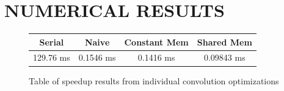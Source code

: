 \documentclass[12pt]{article}
\begin{document}







\section{\MakeUppercase{Numerical Results}}
\label{sec:NumericalResults}
\begin{figure}[h]
\begin{center}
\begin{tabular}{ |c|c|c|c|} 
 \hline
 Serial & Naive & Constant Mem & Shared Mem \\ 
 \hline
 129.76 ms & 0.1546 ms & 0.1416 ms & 0.09843 ms\\
 \hline
\end{tabular}\caption{Table of speedup results from individual convolution optimizations}\label{table:convolutionTimes}
\end{center}
\end{figure}
\end{document}
